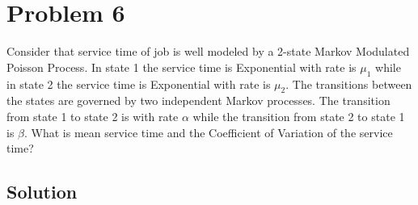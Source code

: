 \section*{Problem 6}

Consider that service time of job is well modeled by a 2-state Markov Modulated Poisson Process.
In state 1 the service time is Exponential with rate is $\mu_1$ while in state 2 the service time is Exponential with rate is $\mu_2$.
The transitions between the states are governed by two independent Markov processes.
The transition from state 1 to state 2 is with rate $\alpha$ while the transition from state 2 to state 1 is $\beta$.
What is mean service time and the Coefficient of Variation of the service time?

\subsection*{Solution}
